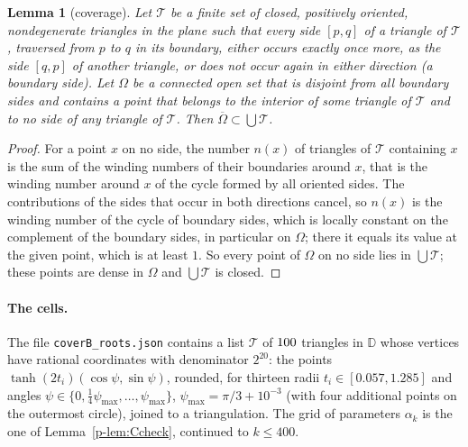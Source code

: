 \documentclass[11pt]{article}
\newtheorem{lemma}[theorem]{Lemma}
\theoremstyle{remark}
\begin{document}
\begin{lemma}[coverage]\label{p-lem:cover}
Let $\mathcal T$ be a finite set of closed, positively oriented, nondegenerate triangles in the
plane such that every side $[p,q]$ of a triangle of $\mathcal T$, traversed from $p$ to $q$ in
its boundary, either occurs exactly once more, as the side $[q,p]$ of another triangle, or does
not occur again in either direction (a \emph{boundary side}). Let $\Omega$ be a connected open
set that is disjoint from all boundary sides and contains a point that belongs to the interior
of some triangle of $\mathcal T$ and to no side of any triangle of $\mathcal T$. Then $\overline\Omega\subset\bigcup\mathcal T$.
\end{lemma}

\begin{proof}
For a point $x$ on no side, the number $n(x)$ of triangles of $\mathcal T$ containing $x$ is
the sum of the winding numbers of their boundaries around $x$, that is the winding number
around $x$ of the cycle formed by all oriented sides. The contributions of the sides that occur
in both directions cancel, so $n(x)$ is the winding number of the cycle of boundary sides, which
is locally constant on the complement of the boundary sides, in particular on $\Omega$; there
it equals its value at the given point, which is at least $1$. So every point of $\Omega$ on no
side lies in $\bigcup\mathcal T$; these points are dense in $\Omega$ and $\bigcup\mathcal T$ is
closed.
\end{proof}

\paragraph{The cells.} The file \texttt{coverB\_roots.json} contains a list $\mathcal T$ of
$100$ triangles in $\mathbb D$ whose vertices have rational coordinates with denominator
$2^{20}$: the points $\tanh(2t_i)(\cos\psi,\sin\psi)$, rounded, for thirteen radii
$t_i\in[0.057,1.285]$ and angles $\psi\in\{0,\frac14\psi_{\max},\dots,\psi_{\max}\}$,
$\psi_{\max}=\pi/3+10^{-3}$ (with four additional points on the outermost circle), joined to a
triangulation. The grid of parameters $\alpha_k$ is the one of Lemma~\ref{p-lem:Ccheck},
continued to $k\le400$.
\end{document}
